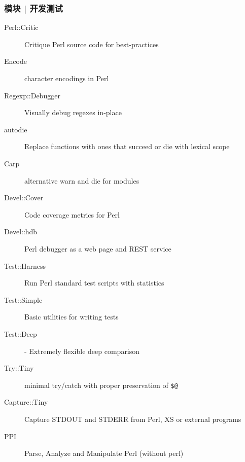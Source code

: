 \begin{frame}[fragile]
  \frametitle{模块 | 开发测试}
    \begin{description}
      \item[Perl::Critic] Critique Perl source code for best-practices
      \item[Encode] character encodings in Perl
      \item[Regexp::Debugger] Visually debug regexes in-place
      \item[autodie] Replace functions with ones that succeed or die with lexical scope
      \item[Carp] alternative warn and die for modules
      \item[Devel::Cover] Code coverage metrics for Perl
      \item[Devel::hdb] Perl debugger as a web page and REST service
      \item[Test::Harness] Run Perl standard test scripts with statistics
      \item[Test::Simple] Basic utilities for writing tests
      \item[Test::Deep] - Extremely flexible deep comparison
      \item[Try::Tiny] minimal try/catch with proper preservation of \verb|$@| 
      \item[Capture::Tiny] Capture STDOUT and STDERR from Perl, XS or external programs
      \item[PPI] Parse, Analyze and Manipulate Perl (without perl)
    \end{description}
\end{frame}

